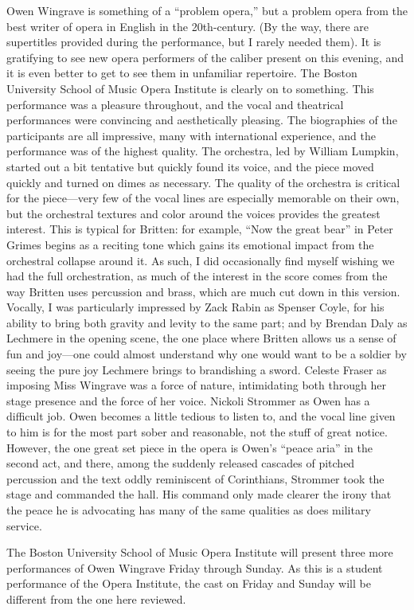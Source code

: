 Owen Wingrave is something of a “problem opera,” but a problem opera from the best writer of opera in English in the 20th-century. (By the way, there are supertitles provided during the performance, but I rarely needed them). It is gratifying to see new opera performers of the caliber present on this evening, and it is even better to get to see them in unfamiliar repertoire. The Boston University School of Music Opera Institute is clearly on to something. This performance was a pleasure throughout, and the vocal and theatrical performances were convincing and aesthetically pleasing. The biographies of the participants are all impressive, many with international experience, and the performance was of the highest quality. The orchestra, led by William Lumpkin, started out a bit tentative but quickly found its voice, and the piece moved quickly and turned on dimes as necessary. The quality of the orchestra is critical for the piece—very few of the vocal lines are especially memorable on their own, but the orchestral textures and color around the voices provides the greatest interest. This is typical for Britten: for example, “Now the great bear” in Peter Grimes begins as a reciting tone which gains its emotional impact from the orchestral collapse around it. As such, I did occasionally find myself wishing we had the full orchestration, as much of the interest in the score comes from the way Britten uses percussion and brass, which are much cut down in this version. Vocally, I was particularly impressed by Zack Rabin as Spenser Coyle, for his ability to bring both gravity and levity to the same part; and by Brendan Daly as Lechmere in the opening scene, the one place where Britten allows us a sense of fun and joy—one could almost understand why one would want to be a soldier by seeing the pure joy Lechmere brings to brandishing a sword. Celeste Fraser as imposing Miss Wingrave was a force of nature, intimidating both through her stage presence and the force of her voice. Nickoli Strommer as Owen has a difficult job. Owen becomes a little tedious to listen to, and the vocal line given to him is for the most part sober and reasonable, not the stuff of great notice. However, the one great set piece in the opera is Owen’s “peace aria” in the second act, and there, among the suddenly released cascades of pitched percussion and the text oddly reminiscent of Corinthians, Strommer took the stage and commanded the hall. His command only made clearer the irony that the peace he is advocating has many of the same qualities as does military service.

The Boston University School of Music Opera Institute will present three more performances of Owen Wingrave Friday through Sunday. As this is a student performance of the Opera Institute, the cast on Friday and Sunday will be different from the one here reviewed.
